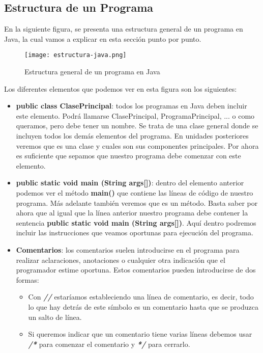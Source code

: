 \subsection{Estructura de un Programa}
En la siguiente figura, se presenta una estructura general de un programa en Java, la cual vamos a explicar en esta sección punto por punto.

\begin{figure}[H]
    \centering
    \texttt{[image: estructura-java.png]}
    \caption{Estructura general de un programa en Java}
\end{figure}

Los diferentes elementos que podemos ver en esta figura son los siguientes:

\begin{itemize}
    \item \textbf{public class ClasePrincipal}: todos los programas en Java deben incluir este elemento. Podrá llamarse ClasePrincipal, ProgramaPrincipal, ... o como queramos, pero debe tener un nombre. Se trata de una clase general donde se incluyen todos los demás elementos del programa. En unidades posteriores veremos que es una clase y cuales son sus componentes principales. Por ahora es suficiente que sepamos que nuestro programa debe comenzar con este elemento.

    \item \textbf{public static void main (String args[])}: dentro del elemento anterior podemos ver el método \textbf{main()} que contiene las líneas de código de nuestro programa. Más adelante también veremos que es un método. Basta saber por ahora que al igual que la línea anterior nuestro programa debe contener la sentencia \textbf{public static void main (String args[])}. Aquí dentro podremos incluir las instrucciones que veamos oportunas para ejecución del programa.

    \item \textbf{Comentarios}: los comentarios suelen introducirse en el programa para realizar aclaraciones, anotaciones o cualquier otra indicación que el programador estime oportuna. Estos comentarios pueden introducirse de dos formas:

    \begin{itemize}
        \item Con \textit{\textbf{//}} estaríamos estableciendo una línea de comentario, es decir, todo lo que hay detrás de este símbolo es un comentario hasta que se produzca un salto de línea.
        \item Si queremos indicar que un comentario tiene varias líneas debemos usar \textit{\textbf{/*} }para comenzar el comentario y \textit{\textbf{*/}} para cerrarlo.
    \end{itemize}


\end{itemize}
